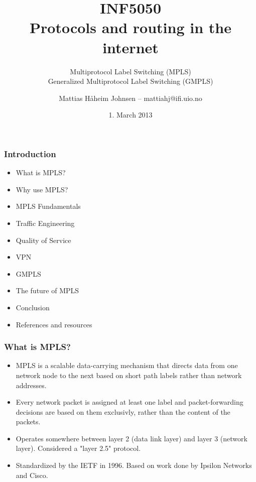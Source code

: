 \documentclass[12pt]{beamer}
\title[]{INF5050 \\ Protocols and routing in the internet}
\subtitle[]{Multiprotocol Label Switching (MPLS) \\ Generalized Multiprotocol Label Switching (GMPLS)}
\author{Mattias H{\aa}heim Johnsen -- mattiahj@ifi.uio.no}
\date{1. March 2013}
\begin{document}
\begin{frame}
    \titlepage
\end{frame}

\begin{frame}
  \frametitle{Introduction}
  \begin{itemize}
  \item What is MPLS?
  \item Why use MPLS?
  \item MPLS Fundamentals
  \item Traffic Engineering
  \item Quality of Service
  \item VPN
  \item GMPLS
  \item The future of MPLS
  \item Conclusion
  \item References and resources
  \end{itemize}
\end{frame}

\begin{frame}
  \frametitle{What is MPLS?}
  \begin{itemize}
    \item MPLS is a scalable data-carrying mechanism that directs data from one network node to the next based on short path labels rather than network addresses.
    \item Every network packet is assigned at least one label and packet-forwarding decisions are based on them exclusivly, rather than the content of the packets.
    \item Operates somewhere between layer 2 (data link layer) and layer 3 (network layer). Considered a "layer 2.5" protocol.
    \item Standardized by the IETF in 1996. Based on work done by Ipsilon Networks and Cisco.
  \end{itemize}
\end{frame}
\end{document}
